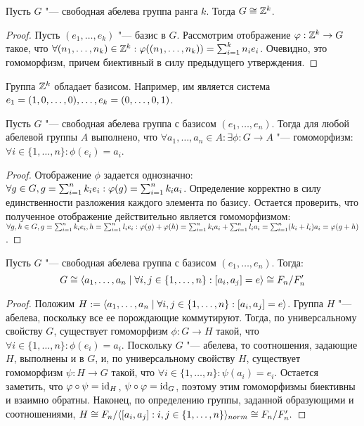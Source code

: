 \begin{proposition}
	Пусть $G$ "--- свободная абелева группа ранга $k$. Тогда $G \cong \mathbb{Z}^k$.
\end{proposition}

\begin{proof}
	Пусть $(e_1, \dotsc, e_k)$ "--- базис в $G$. Рассмотрим отображение $\varphi: \mathbb{Z}^k \to G$ такое, что $\forall (n_1, \dotsc, n_k) \in \Z^k: \phi((n_1, \dotsc, n_k)) \hm= \sum_{i = 1}^kn_ie_i$. Очевидно, это гомоморфизм, причем биективный в силу предыдущего утверждения.
\end{proof}

\begin{note}
	Группа $\mathbb{Z}^k$ обладает базисом. Например, им является система $e_1 \hm= (1, 0, \dotsc, 0), \dotsc, e_k = (0, \dotsc, 0, 1)$.
\end{note}

\begin{proposition}
	Пусть $G$ "--- свободная абелева группа с базисом $(e_1, \dotsc, e_n)$. Тогда для любой абелевой группы $A$ выполнено, что $\forall a_1, \dotsc, a_n \in A: \exists \phi: G \to A$ "--- гомоморфизм: $\forall i \in \{1, \dotsc, n\}: \phi(e_i) = a_i$.
\end{proposition}

\begin{proof}
	Отображение $\phi$ задается однозначно: $\forall g \in G, g \hm= \sum_{i = 1}^nk_ie_i: \phi(g) \hm= \sum_{i = 1}^nk_ia_i$. Определение корректно в силу единственности разложения каждого элемента по базису. Остается проверить, что полученное отображение действительно является гомоморфизмом: $\forall g, h \in G, g = \sum_{i = 1}^nk_ie_i, h = \sum_{i = 1}^nl_ie_i: \phi(g) + \phi(h) \hm= \sum_{i = 1}^nk_ia_i + \sum_{i = 1}^nl_ia_i \hm= \sum_{i = 1}^n(k_i + l_i)a_i = \phi(g + h)$.
\end{proof}

\begin{proposition}
	Пусть $G$ "--- свободная абелева группа с базисом $(e_1, \dotsc, e_n)$. Тогда:
	\[G \cong \langle a_1, \dotsc, a_n \mid \forall i, j \in \{1, \dotsc, n\}: [a_i, a_j] = e \rangle \cong F_n / F_n'\]
\end{proposition}

\begin{proof}
	Положим $H := \langle a_1, \dotsc, a_n \mid \forall i, j \in \{1, \dotsc, n\}: [a_i, a_j] = e \rangle$. Группа $H$ "--- абелева, поскольку все ее порождающие коммутируют. Тогда, по универсальному свойству $G$, существует гомоморфизм $\phi: G \to H$ такой, что $\forall i \in \{1, \dotsc, n\}: \phi(e_i) = a_i$. Поскольку $G$ "--- абелева, то соотношения, задающие $H$, выполнены и в $G$, и, по универсальному свойству $H$, существует гомоморфизм $\psi: H \to G$ такой, что $\forall i \in \{1, \dotsc, n\}: \psi(a_i) = e_i$. Остается заметить, что $\varphi \circ \psi = \operatorname{id}_H$, $\psi \circ \varphi = \operatorname{id}_G$, поэтому этим гомоморфизмы биективны и взаимно обратны. Наконец, по определению группы, заданной образующими и соотношениями, $H \cong F_n / \gl [a_i, a_j] : i, j \hm\in \{1, \dotsc, n\}\gr_{norm} \cong F_n / F_n'.$
\end{proof}

